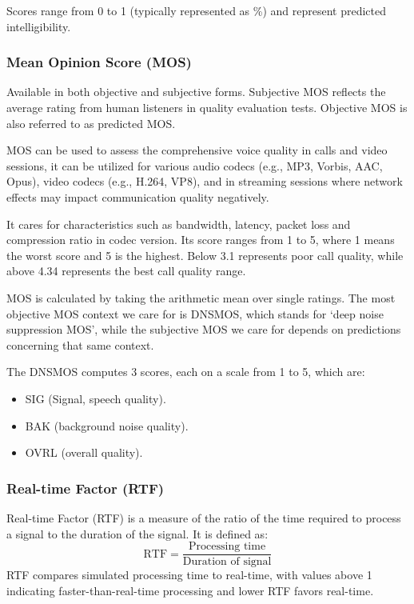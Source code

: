 Scores range from 0 to 1 (typically represented as \%) and represent predicted intelligibility.

\subsubsection{Mean Opinion Score (MOS)}
Available in both objective and subjective forms. Subjective MOS reflects the average rating from human listeners in quality evaluation tests. Objective MOS is also referred to as predicted MOS.

MOS can be used to assess the comprehensive voice quality in calls and video sessions, it can be utilized for various audio codecs (e.g., MP3, Vorbis, AAC, Opus), video codecs (e.g., H.264, VP8), and in streaming sessions where network effects may impact communication quality negatively.

It cares for characteristics such as bandwidth, latency, packet loss and compression ratio in codec version. Its score ranges from 1 to 5, where 1 means the worst score and 5 is the highest. Below 3.1 represents poor call quality, while above 4.34 represents the best call quality range.

MOS is calculated by taking the arithmetic mean over single ratings. The most objective MOS context we care for is DNSMOS, which stands for ‘deep noise suppression MOS’, while the subjective MOS we care for depends on predictions concerning that same context.

The DNSMOS computes 3 scores, each on a scale from 1 to 5, which are:

\begin{itemize}
    \item SIG (Signal, speech quality).
    \item BAK (background noise quality).
    \item OVRL (overall quality).
\end{itemize}


\subsubsection{Real-time Factor (RTF)}
Real-time Factor (RTF) is a measure of the ratio of the time required to process a signal to the duration of the signal. It is defined as:
\begin{equation}
    \text{RTF} = \frac{\text{Processing time}}{\text{Duration of signal}}
\end{equation}
RTF compares simulated processing time to real-time, with values above 1 indicating faster-than-real-time processing and lower RTF favors real-time.

